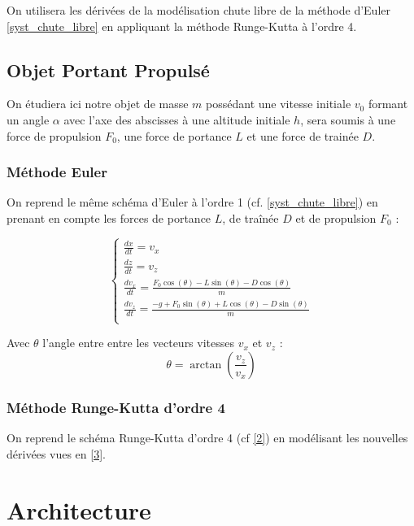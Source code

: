 \documentclass[a4paper,oneside]{article}
\begin{document}
On utilisera les dérivées de la modélisation chute libre de la méthode d'Euler \ref{syst_chute_libre} en appliquant la méthode Runge-Kutta à l'ordre 4.


\subsection{Objet Portant Propulsé}

On étudiera ici notre objet de masse $m$ possédant une vitesse initiale $v_0$ formant un angle $\alpha$ avec l'axe des abscisses à une altitude initiale $h$, sera soumis à une force de propulsion $F_0$, une force de portance $L$ et une force de trainée $D$.

\subsubsection{Méthode Euler}
On reprend le même schéma d'Euler à l'ordre 1 (cf. \ref{syst_chute_libre}) en prenant en compte les forces de portance $L$, de traînée $D$ et de propulsion $F_0$ :
\label{3}

\begin{equation*}
\begin{cases} 
\frac{dx}{dt} = v_{x}\\
\frac{dz}{dt} = v_{z}\\
\frac{dv_{x}}{dt} = \frac{  F_0 \cos(\theta) -L\sin(\theta) - D \cos(\theta) }{m}\\
\frac{dv_{z}}{dt} = \frac{ -g + F_0 \sin(\theta) +L\cos(\theta) - D \sin(\theta) }{m}\\
\end{cases}
\end{equation*}

 Avec $\theta $ l'angle entre entre les vecteurs vitesses  $v_x$ et $v_z$ : 
 \begin{equation*}
 	 \theta = \arctan(\frac{v_z}{v_x})
 \end{equation*}

 \subsubsection{Méthode Runge-Kutta d'ordre 4}
 
 On reprend le schéma Runge-Kutta d'ordre 4 (cf \ref{2}) en modélisant les nouvelles dérivées vues en \ref{3}.
 
\section{Architecture}
\end{document}
